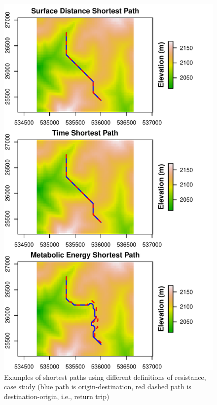 \documentclass[]{elsarticle} %
\makeatletter
\def\maxwidth{\ifdim\Gin@nat@width>\linewidth\linewidth
\else\Gin@nat@width\fi}
\let\Oldincludegraphics\includegraphics
\renewcommand{\includegraphics}[1]{\Oldincludegraphics[width=\maxwidth]{#1}}
\makeatother
\begin{document}
\begin{figure}
\centering
\includegraphics{Cost-Functions-for-Walking-Accessibility_files/figure-latex/figure-shortest-paths-kenya-1.pdf}
\caption{\label{fig:figure-shortest-paths-kenya}Examples of shortest
paths using different definitions of resistance, case study (blue path
is origin-destination, red dashed path is destination-origin, i.e.,
return trip)}
\end{figure}
\end{document}
